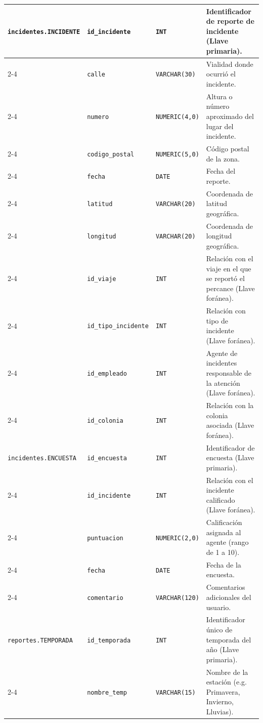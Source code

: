 \begin{longtable}{|p{3.2cm}|p{2.7cm}|p{3.0cm}|p{6.0cm}|}
	\texttt{incidentes.INCIDENTE} & \texttt{id\_incidente} & \texttt{INT} & Identificador de reporte de incidente (Llave primaria). \\ \cline{2-4}
	& \texttt{calle} & \texttt{VARCHAR(30)} & Vialidad donde ocurrió el incidente. \\ \cline{2-4}
	& \texttt{numero} & \texttt{NUMERIC(4,0)} & Altura o número aproximado del lugar del incidente. \\ \cline{2-4}
	& \texttt{codigo\_postal} & \texttt{NUMERIC(5,0)} & Código postal de la zona. \\ \cline{2-4}
	& \texttt{fecha} & \texttt{DATE} & Fecha del reporte. \\ \cline{2-4}
	& \texttt{latitud} & \texttt{VARCHAR(20)} & Coordenada de latitud geográfica. \\ \cline{2-4}
	& \texttt{longitud} & \texttt{VARCHAR(20)} & Coordenada de longitud geográfica. \\ \cline{2-4}
	& \texttt{id\_viaje} & \texttt{INT} & Relación con el viaje en el que se reportó el percance (Llave foránea). \\ \cline{2-4}
	& \texttt{id\_tipo\_incidente} & \texttt{INT} & Relación con tipo de incidente (Llave foránea). \\ \cline{2-4}
	& \texttt{id\_empleado} & \texttt{INT} & Agente de incidentes responsable de la atención (Llave foránea). \\ \cline{2-4}
	& \texttt{id\_colonia} & \texttt{INT} & Relación con la colonia asociada (Llave foránea). \\ \hline
	
	\texttt{incidentes.ENCUESTA} & \texttt{id\_encuesta} & \texttt{INT} & Identificador de encuesta (Llave primaria). \\ \cline{2-4}
	& \texttt{id\_incidente} & \texttt{INT} & Relación con el incidente calificado (Llave foránea). \\ \cline{2-4}
	& \texttt{puntuacion} & \texttt{NUMERIC(2,0)} & Calificación asignada al agente (rango de 1 a 10). \\ \cline{2-4}
	& \texttt{fecha} & \texttt{DATE} & Fecha de la encuesta. \\ \cline{2-4}
	& \texttt{comentario} & \texttt{VARCHAR(120)} & Comentarios adicionales del usuario. \\ \hline
	
	\texttt{reportes.TEMPORADA} & \texttt{id\_temporada} & \texttt{INT} & Identificador único de temporada del año (Llave primaria). \\ \cline{2-4}
	& \texttt{nombre\_temp} & \texttt{VARCHAR(15)} & Nombre de la estación (e.g. Primavera, Invierno, Lluvias). \\ \hline
	

\end{longtable}
